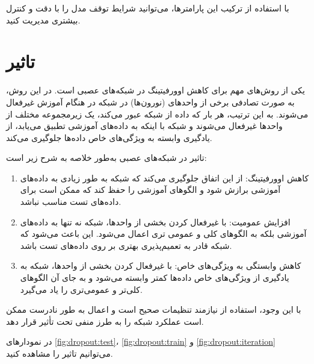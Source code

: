 \documentclass[12pt, dvipsnames, svgnames, x11names,]{article}
\begin{document}
			با استفاده از ترکیب این پارامترها، می‌توانید شرایط توقف مدل  را با دقت و کنترل بیشتری مدیریت کنید.
				
		
		
	\section{تاثیر }
	
		 یکی از روش‌های مهم برای کاهش اوورفیتینگ در شبکه‌های عصبی است. در این روش، به صورت تصادفی برخی از واحدهای (نورون‌ها) در شبکه در هنگام آموزش غیرفعال می‌شوند. به این ترتیب، هر بار که داده از شبکه عبور می‌کند، یک زیرمجموعه مختلف از واحدها غیرفعال می‌شوند و شبکه با اینکه به داده‌های آموزشی تطبیق می‌یابد، از یادگیری وابسته به ویژگی‌های خاص داده‌ها جلوگیری می‌کند.
		
		تاثیر  در شبکه‌های عصبی به‌طور خلاصه به شرح زیر است:
		
		\begin{enumerate}
			
			\item کاهش اوورفیتینگ:
			 از این اتفاق جلوگیری می‌کند که شبکه به طور زیادی به داده‌های آموزشی برازش شود و الگوهای آموزشی را حفظ کند که ممکن است برای داده‌های تست مناسب نباشد.
			
			\item افزایش عمومیت:
			با غیرفعال کردن بخشی از واحدها، شبکه نه تنها به داده‌های آموزشی بلکه به الگوهای کلی و عمومی تری اعمال می‌شود. این باعث می‌شود که شبکه قادر به تعمیم‌پذیری بهتری بر روی داده‌های تست باشد.
			
			\item کاهش وابستگی به ویژگی‌های خاص:
			با غیرفعال کردن بخشی از واحدها، شبکه به یادگیری از ویژگی‌های خاص داده‌ها کمتر وابسته می‌شود و به جای آن الگوهای کلی‌تر و عمومی‌تری را یاد می‌گیرد.
			
		\end{enumerate}
		
		با این وجود، استفاده از  نیازمند تنظیمات صحیح است و اعمال  به طور نادرست ممکن است عملکرد شبکه را به طرز منفی تحت تأثیر قرار دهد.
		
		در نمودارهای \ref{fig:dropout:test}، \ref{fig:dropout:train} و \ref{fig:dropout:iteration} می‌توانیم تاثیر  را مشاهده کنید.
		
\end{document}
